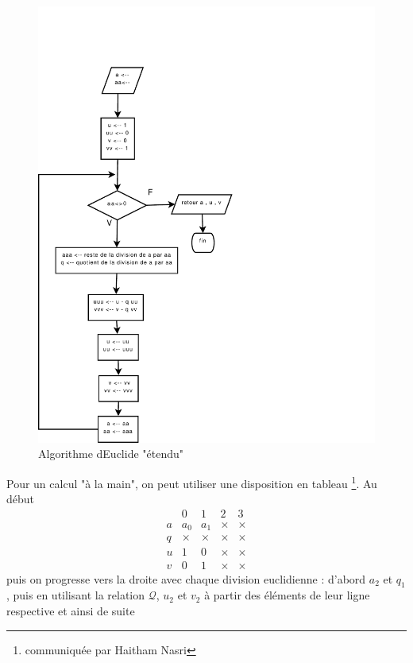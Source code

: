 \begin{figure}[ht]
 \centering
 \includegraphics[width=12cm]{C5546_3.pdf}
 \caption{Algorithme dEuclide "étendu"}
 \label{C5546_3}
\end{figure}
\newline Pour un calcul "à la main", on peut utiliser une disposition en tableau \footnote{communiquée par Haitham Nasri}. Au début
\begin{displaymath}
\begin{array}{l|l|l|l|l}
 & 0 & 1 & 2 & 3 \\ \hline
a & a_0 & a_1 & × & × \\ 
q & × & × & × & × \\ 
u & 1 & 0 & × & × \\
v & 0 & 1 & × & ×
\end{array}
\end{displaymath}
puis on progresse vers la droite avec chaque division euclidienne : d'abord $a_2$ et $q_1$, puis en utilisant la relation $\mathcal Q$,  $u_2$ et $v_2$ à partir des éléments de leur ligne respective et ainsi de suite
